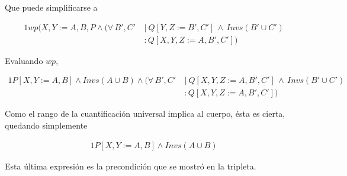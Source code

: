 Que puede simplificarse a

\begin{alignat}{1}
wp(X,Y := A,B, P \land (\forall\, B',C'\ &|\ Q [Y,Z := B',C']\, \land\, Invs (B' \cup C')  \nonumber \\
                                       &:  Q [X,Y,Z := A, B',C'])
\end{alignat}

Evaluando $wp$,

\begin{alignat}{1}
P[X,Y := A,B] \land Invs (A \cup B) \land (\forall\, B',C'\ &|\ Q [X,Y,Z := A,B',C']\, \land\, Invs (B' \cup C')  \nonumber \\
                                                          &:  Q [X,Y,Z := A, B',C'])
\end{alignat}

Como el rango de la cuantificación universal implica al cuerpo, ésta es cierta,
quedando simplemente

\begin{alignat}{1}
P[X,Y := A,B] \land Invs (A \cup B)
\end{alignat}

Esta última expresión es la precondición que se mostró en la tripleta.
